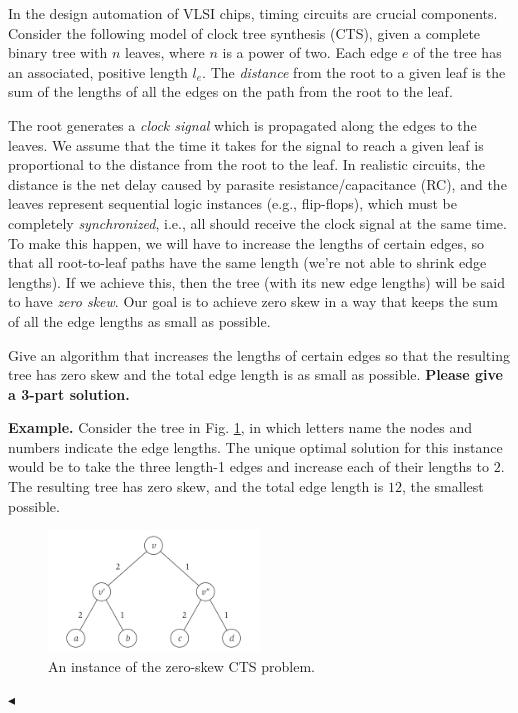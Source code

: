 \documentclass[11pt]{article}
\newenvironment{problem}[2][Problem]{\begin{trivlist}
\item[\hskip \labelsep{\bfseries#1}\hskip\labelsep{\bfseries#2.}]}{\hfill$\blacktriangleleft$\end{trivlist}}
\begin{document}
\begin{problem}{4 (Clock Tree Synthesis)}
    In the design automation of VLSI chips, timing circuits are crucial components. Consider the following model of clock tree synthesis (CTS), given a complete binary tree with $n$ leaves, where $n$ is a power of two. Each edge $e$ of the tree has an associated, positive length $l_e$. The \textit{distance} from the root to a given leaf is the sum of the lengths of all the edges on the path from the root to the leaf.
    
    The root generates a \textit{clock signal} which is propagated along the edges to the leaves. We assume that the time it takes for the signal to reach a given leaf is proportional to the distance from the root to the leaf. In realistic circuits, the distance is the net delay caused by parasite resistance/capacitance (RC), and the leaves represent sequential logic instances (e.g., flip-flops), which must be completely \textit{synchronized}, i.e., all should receive the clock signal at the same time. To make this happen, we will have to increase the lengths of certain edges, so that all root-to-leaf paths have the same length (we’re not able to shrink edge lengths). If we achieve this, then the tree (with its new edge lengths) will be said to have \textit{zero skew}. Our goal is to achieve zero skew in a way that keeps the sum of all the edge lengths as small as possible.

    Give an algorithm that increases the lengths of certain edges so that the resulting tree has zero skew and the total edge length is as small as possible. \textbf{Please give a 3-part solution.}

    \textbf{Example.} Consider the tree in Fig. \ref{fig1}, in which letters name the nodes and numbers indicate the edge lengths. The unique optimal solution for this instance would be to take the three length-1 edges and increase each of their lengths to $2$. The resulting tree has zero skew, and the total edge length is $12$, the smallest possible.

    \begin{figure}[H]
        \centering
        \includegraphics[width=0.5\textwidth]{iamge/cts.png}
        \caption{An instance of the zero-skew CTS problem.}
        \label{fig1}
    \end{figure}
\end{problem}
\end{document}
